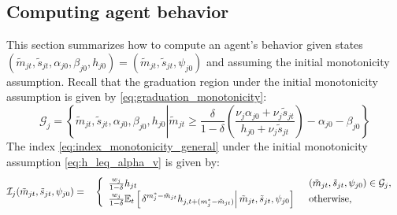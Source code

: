 \documentclass[11 pt]{article}
\newcommand{\pr}[1]{\left( #1 \right)}
\newcommand{\ce}[2]{\left[\left. #1 \right\vert #2 \right]}
\newcommand{\study}{m} %
\newcommand{\pass}{s}
\newcommand{\states}{\tilde{\study}_{jt}, \tilde{\pass}_{jt}, \alpha_{j0}, \beta_{j0}, h_{j0}}
\newcommand{\pstates}{\tilde{\study}_{jt}, \tilde{\pass}_{jt}, \psi_{j0}}
\begin{document}
\subsection{Computing agent behavior}\label{sec:computing}

This section summarizes how to compute an agent's behavior given states $(\states) = (\pstates)$ and assuming the initial monotonicity assumption. 
Recall that the graduation region under the initial monotonicity assumption is given by \eqref{eq:graduation_monotonicity}: 
\begin{equation*}
     \mathcal{G}_j = 
     \left\{ \states \left\vert
     \tilde{\study}_{jt} \geq \frac{\delta}{1 - \delta}
    \pr{
        \frac{\nu_j \alpha_{j0} + \nu_j \tilde{\pass}_{jt}}{h_{j0} + \nu_j \tilde{\pass}_{jt}}
    } - \alpha_{j0} - \beta_{j0}
     \right. \right\}
 \end{equation*} 
The index \eqref{eq:index_monotonicity_general} under the initial monotonicity assumption \eqref{eq:h_leq_alpha_v} is given by:
\begin{alignat*}{4}
    \label{eq:index_monotonicity}
    &\mathcal{I}_j (\pstates)
    =&&
    \begin{cases}
    \begin{array}{l}
    \frac{w_j}{1 - \delta} 
    h_{jt}
    \end{array}
    &(\pstates) \in \mathcal{G}_j,
    \\
    \begin{array}{l}
    \frac{w_j}{1 - \delta} 
    \EE_t \ce{
        \delta^{\study_j^* - \tilde{\study}_{jt}}
        h_{j,t + (\study_j^* - \tilde{\study}_{jt})}
    }{\pstates}
    \end{array}
    &\text{otherwise,}
    \end{cases} 
\end{alignat*}
\end{document}
